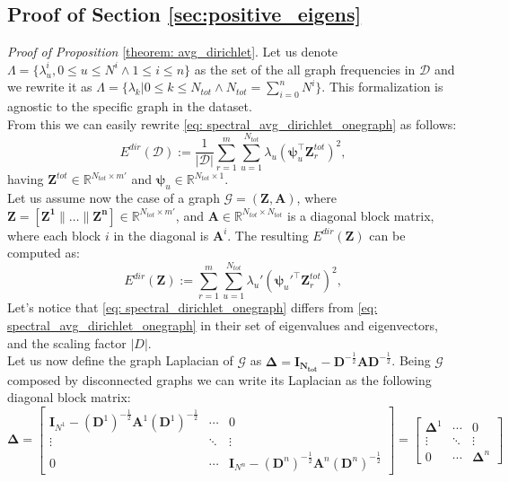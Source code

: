 \subsection{Proof of Section \ref{sec:positive_eigens}}
\label{app: proof}
\textit{Proof of Proposition} \ref{theorem: avg_dirichlet}. Let us denote $\Lambda = \{\lambda_u^i, 0 \leq u \leq N^i \wedge 1 \leq i \leq n\}$ as the set of the all graph frequencies in $\mathcal{D}$ and we rewrite it as $\Lambda = \{\lambda_k | 0 \leq k \leq N_{tot} \wedge N_{tot} = \sum_{i = 0}^{n} N^i\}$. This formalization is agnostic to the specific graph in the dataset. \\
From this we can easily rewrite \eqref{eq: spectral_avg_dirichlet_onegraph} as follows:
\begin{equation}
\label{eq: spectral_avg_dirichlet_onegraph}
   E^{dir}(\mathcal{D}) := \frac{1}{|\mathcal{D}|} \sum_{r = 1}^{m} \sum_{u = 1}^{N_{tot}} \lambda_u(\bm{\psi}_u^{\top} \mathbf{Z}^{tot}_{r})^2,
\end{equation}
having $\mathbf{Z}^{tot} \in \mathbb{R}^{N_{tot} \times m'}$ and $\bm{\psi}_u \in \mathbb{R}^{N_{tot} \times 1}$. \\
Let us assume now the case of a graph $\mathcal{G} = (\mathbf{Z}, \mathbf{A})$, where $\mathbf{Z} = [\mathbf{Z^1} \|\ldots \| \mathbf{Z^n}] \in \mathbb{R}^{N_{tot} \times m'}$, and $\mathbf{A} \in \mathbb{R}^{N_{tot} \times N_{tot}}$ is a diagonal block matrix, where each block $i$ in the diagonal is $\mathbf{A}^i$. The resulting $E^{dir}(\mathbf{Z})$ can be computed as: 
\begin{equation}
\label{eq: spectral_dirichlet_onegraph}
   E^{dir}(\mathbf{Z}) := \sum_{r = 1}^{m} \sum_{u = 1}^{N_{tot}} \lambda_u'(\bm{\psi}_u'^{\top} \mathbf{Z}^{tot}_{r})^2,
\end{equation}
Let's notice that \eqref{eq: spectral_dirichlet_onegraph} differs from \eqref{eq: spectral_avg_dirichlet_onegraph} in their set of eigenvalues and eigenvectors, and the scaling factor $|D|$.\\
Let us now define the graph Laplacian of $\mathcal{G}$ as $\mathbf{\Delta} = \mathbf{I_{N_{tot}}} - \mathbf{D}^{-\frac{1}{2}}\mathbf{A}\mathbf{D}^{-\frac{1}{2}}$. Being $\mathcal{G}$ composed by disconnected graphs we can write its Laplacian as the following diagonal block matrix:
\begin{equation}
\label{eq: unique_laplacian}
\mathbf{\Delta} = \begin{bmatrix}
\mathbf{I}_{N^1} - (\mathbf{D}^1)^{-\frac{1}{2}}\mathbf{A}^1(\mathbf{D}^1)^{-\frac{1}{2}} & \cdots & 0 \\
\vdots & \ddots & \vdots \\
0 & \cdots & \mathbf{I}_{N^n} - (\mathbf{D}^n)^{-\frac{1}{2}}\mathbf{A}^n(\mathbf{D}^n)^{-\frac{1}{2}}
\end{bmatrix} = \begin{bmatrix}
\mathbf{\Delta}^1 & \cdots & 0 \\
\vdots & \ddots & \vdots \\
0 & \cdots & \mathbf{\Delta}^n
\end{bmatrix}
\end{equation}
